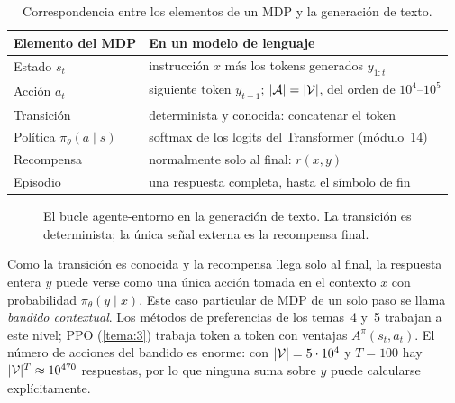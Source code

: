 \begin{table}[h]
\centering\small
\begin{tabular}{@{}ll@{}}
\toprule
Elemento del MDP & En un modelo de lenguaje \\
\midrule
Estado $s_t$ & instrucción $x$ más los tokens generados $y_{1:t}$ \\
Acción $a_t$ & siguiente token $y_{t+1}$; $\lvert\mathcal{A}\rvert=\lvert\mathcal{V}\rvert$, del orden de $10^{4}$--$10^{5}$ \\
Transición & determinista y conocida: concatenar el token \\
Política $\pi_\theta(a\mid s)$ & softmax de los logits del Transformer (módulo~14) \\
Recompensa & normalmente solo al final: $r(x,y)$ \\
Episodio & una respuesta completa, hasta el símbolo de fin \\
\bottomrule
\end{tabular}
\caption{Correspondencia entre los elementos de un MDP y la generación de texto.}
\label{tab:mdp-llm}
\end{table}

\begin{figure}[h]
\centering
{}
\caption{El bucle agente-entorno en la generación de texto. La transición es determinista; la única señal externa es la recompensa final.}
\label{fig:bucle}
\end{figure}

\begin{observacion}\label{obs:bandido}
Como la transición es conocida y la recompensa llega solo al final, la respuesta entera $y$ puede verse como una única acción tomada en el contexto $x$ con probabilidad $\pi_\theta(y\mid x)$. Este caso particular de MDP de un solo paso se llama \emph{bandido contextual}. Los métodos de preferencias de los temas~4 y~5 trabajan a este nivel; PPO (\cref{tema:3}) trabaja token a token con ventajas $A^{\pi}(s_t,a_t)$. El número de acciones del bandido es enorme: con $\lvert\mathcal{V}\rvert=5\cdot 10^{4}$ y $T=100$ hay $\lvert\mathcal{V}\rvert^{T}\approx 10^{470}$ respuestas, por lo que ninguna suma sobre $y$ puede calcularse explícitamente.
\end{observacion}

